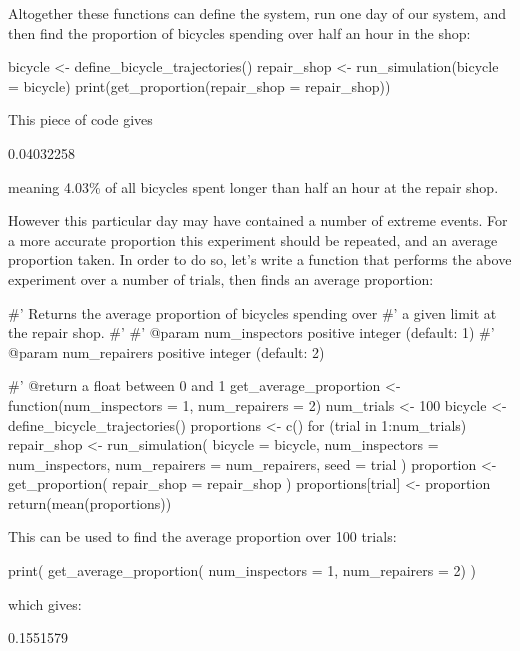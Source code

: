 Altogether these functions can define the system, run one day of our system, and
then find the proportion of bicycles spending over half an hour in the shop:

\begin{Rin}
bicycle <- define_bicycle_trajectories()
repair_shop <- run_simulation(bicycle = bicycle)
print(get_proportion(repair_shop = repair_shop))
\end{Rin}

This piece of code gives

\begin{Rout}
[1] 0.04032258
\end{Rout}

meaning 4.03\% of all bicycles spent longer than half an hour at the repair
shop.

However this particular day may have contained a number of extreme events.
For a more accurate proportion this experiment should be repeated, and an
average proportion taken.
In order to do so, let's write a function that performs the above experiment
over a number of trials, then finds an average proportion:

\begin{Rin}
#' Returns the average proportion of bicycles spending over
#' a given limit at the repair shop.
#'
#' @param num_inspectors positive integer (default: 1)
#' @param num_repairers positive integer (default: 2)

#' @return a float between 0 and 1
get_average_proportion <- function(num_inspectors = 1,
                                   num_repairers = 2) {
  num_trials <- 100
  bicycle <- define_bicycle_trajectories()
  proportions <- c()
  for (trial in 1:num_trials) {
    repair_shop <- run_simulation(
      bicycle = bicycle,
      num_inspectors = num_inspectors,
      num_repairers = num_repairers,
      seed = trial
    )
    proportion <- get_proportion(
      repair_shop = repair_shop
    )
    proportions[trial] <- proportion
  }
  return(mean(proportions))
}
\end{Rin}

This can be used to find the average proportion over 100 trials:

\begin{Rin}
print(
  get_average_proportion(
    num_inspectors = 1,
    num_repairers = 2)
)
\end{Rin}

which gives:

\begin{Rout}
[1] 0.1551579
\end{Rout}

